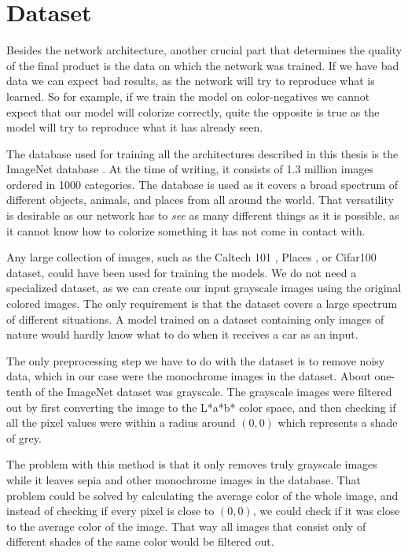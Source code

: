 \section{Dataset}
\label{sec:dataset}

Besides the network architecture, another crucial part that determines the quality
of the final product is the data on which the network was trained. If we have bad
data we can expect bad results, as the network will try to reproduce what is learned.
So for example, if we train the model on color-negatives we cannot expect that 
our model will colorize correctly, quite the opposite is true as the model will
try to reproduce what it has already seen. 

The database used for training all the architectures described in this thesis is 
the ImageNet database \citep{deng2009imagenet}. At the time of writing, it 
consists of 1.3 million images ordered in 1000 categories. The database is used 
as it covers a broad spectrum of different objects, animals, and places from all 
around the world. That versatility is desirable as our network has to \textit{see}
as many different things as it is possible, as it cannot know how to colorize something 
it has not come in contact with.

Any large collection of images, such as the Caltech 101 \citep{fei2004caltech}, 
Places \citep{zhou2017places}, or Cifar100\citep{krizhevskycifar} dataset, 
could have been used for training the models. We do not need a specialized dataset, 
as we can create our input grayscale images using the original colored images.
The only requirement is that the dataset covers a large spectrum of different
situations. A model trained on a dataset containing only images of nature 
would hardly know what to do when it receives a car as an input.

The only preprocessing step we have to do with the dataset is to remove noisy data, 
which in our case were the monochrome images in the dataset. About one-tenth of 
the ImageNet dataset was grayscale. The grayscale images were filtered out by 
first converting the image to the L*a*b* color space, and then checking if all 
the pixel values were within a radius around $(0, 0)$ which represents a shade of grey. 

The problem with this method is that it only removes truly grayscale images while
it leaves sepia and other monochrome images in the database. That problem could 
be solved by calculating the average color of the whole image, and instead of
checking if every pixel is close to $(0, 0)$, we could check if it was close
to the average color of the image. That way all images that consist only of 
different shades of the same color would be filtered out.
